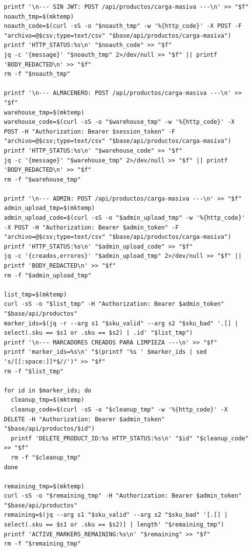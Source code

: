 \begin{tcolorbox}[codebox]
\begin{Verbatim}[fontsize=\scriptsize,breaklines=true,breakanywhere=true]
printf '\n--- SIN JWT: POST /api/productos/carga-masiva ---\n' >> "$f"
noauth_tmp=$(mktemp)
noauth_code=$(curl -sS -o "$noauth_tmp" -w '%{http_code}' -X POST -F "archivo=@$csv;type=text/csv" "$base/api/productos/carga-masiva")
printf 'HTTP_STATUS:%s\n' "$noauth_code" >> "$f"
jq -c '{message}' "$noauth_tmp" 2>/dev/null >> "$f" || printf 'BODY_REDACTED\n' >> "$f"
rm -f "$noauth_tmp"

printf '\n--- ALMACENERO: POST /api/productos/carga-masiva ---\n' >> "$f"
warehouse_tmp=$(mktemp)
warehouse_code=$(curl -sS -o "$warehouse_tmp" -w '%{http_code}' -X POST -H "Authorization: Bearer $session_token" -F "archivo=@$csv;type=text/csv" "$base/api/productos/carga-masiva")
printf 'HTTP_STATUS:%s\n' "$warehouse_code" >> "$f"
jq -c '{message}' "$warehouse_tmp" 2>/dev/null >> "$f" || printf 'BODY_REDACTED\n' >> "$f"
rm -f "$warehouse_tmp"

printf '\n--- ADMIN: POST /api/productos/carga-masiva ---\n' >> "$f"
admin_upload_tmp=$(mktemp)
admin_upload_code=$(curl -sS -o "$admin_upload_tmp" -w '%{http_code}' -X POST -H "Authorization: Bearer $admin_token" -F "archivo=@$csv;type=text/csv" "$base/api/productos/carga-masiva")
printf 'HTTP_STATUS:%s\n' "$admin_upload_code" >> "$f"
jq -c '{creados,errores}' "$admin_upload_tmp" 2>/dev/null >> "$f" || printf 'BODY_REDACTED\n' >> "$f"
rm -f "$admin_upload_tmp"

list_tmp=$(mktemp)
curl -sS -o "$list_tmp" -H "Authorization: Bearer $admin_token" "$base/api/productos"
marker_ids=$(jq -r --arg s1 "$sku_valid" --arg s2 "$sku_bad" '.[] | select(.sku == $s1 or .sku == $s2) | .id' "$list_tmp")
printf '\n--- MARCADORES CREADOS PARA LIMPIEZA ---\n' >> "$f"
printf 'marker_ids=%s\n' "$(printf '%s ' $marker_ids | sed 's/[[:space:]]*$//')" >> "$f"
rm -f "$list_tmp"

for id in $marker_ids; do
  cleanup_tmp=$(mktemp)
  cleanup_code=$(curl -sS -o "$cleanup_tmp" -w '%{http_code}' -X DELETE -H "Authorization: Bearer $admin_token" "$base/api/productos/$id")
  printf 'DELETE_PRODUCT_ID:%s HTTP_STATUS:%s\n' "$id" "$cleanup_code" >> "$f"
  rm -f "$cleanup_tmp"
done

remaining_tmp=$(mktemp)
curl -sS -o "$remaining_tmp" -H "Authorization: Bearer $admin_token" "$base/api/productos"
remaining=$(jq --arg s1 "$sku_valid" --arg s2 "$sku_bad" '[.[] | select(.sku == $s1 or .sku == $s2)] | length' "$remaining_tmp")
printf 'ACTIVE_MARKERS_REMAINING:%s\n' "$remaining" >> "$f"
rm -f "$remaining_tmp"


\end{Verbatim}
\end{tcolorbox}
